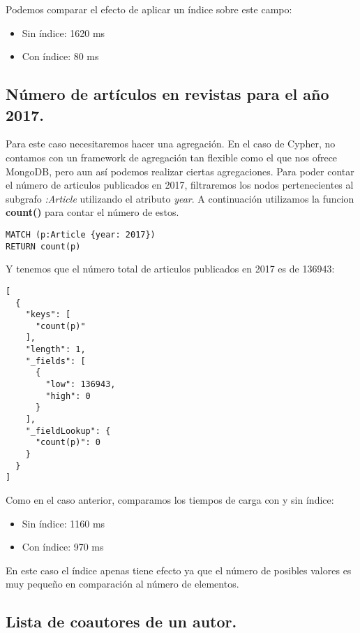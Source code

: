 Podemos comparar el efecto de aplicar un índice sobre este campo:

\begin{itemize}
 \item Sin índice: 1620 ms
 \item Con índice: 80 ms
\end{itemize}


\subsection{Número de artículos en revistas para el año 2017.}

Para este caso necesitaremos hacer una agregación. En el caso de Cypher, no contamos con un framework de agregación tan flexible como el que nos ofrece MongoDB, pero aun así podemos realizar ciertas agregaciones. Para poder contar el número de articulos publicados en 2017, filtraremos los nodos pertenecientes al subgrafo \textit{:Article} utilizando el atributo \textit{year}. A continuación utilizamos la funcion \textbf{count()} para contar el número de estos.

\begin{verbatim}
MATCH (p:Article {year: 2017})
RETURN count(p)
\end{verbatim}

Y tenemos que el número total de articulos publicados en 2017 es de 136943:

\begin{verbatim}
[
  {
    "keys": [
      "count(p)"
    ],
    "length": 1,
    "_fields": [
      {
        "low": 136943,
        "high": 0
      }
    ],
    "_fieldLookup": {
      "count(p)": 0
    }
  }
]
\end{verbatim}

Como en el caso anterior, comparamos los tiempos de carga con y sin índice:

\begin{itemize}
 \item Sin índice: 1160 ms
 \item Con índice: 970 ms
\end{itemize}

En este caso el índice apenas tiene efecto ya que el número de posibles valores es muy pequeño en comparación al número de elementos.

\subsection{Lista de coautores de un autor.}

